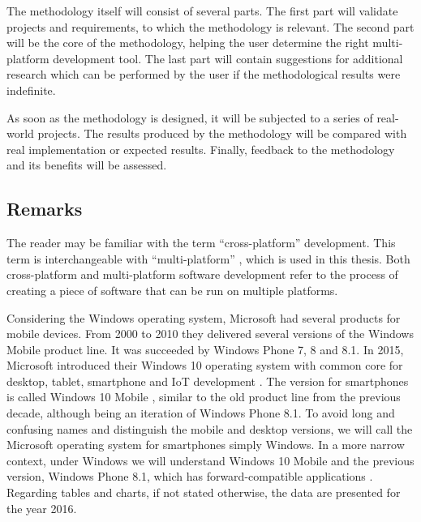 \documentclass[english,master,public,dept460,male,cpdeclaration,oneside]{diploma}
\begin{document}
The methodology itself will consist of several parts. The first part will validate projects and requirements, to which the methodology is relevant. The second part will be the core of the methodology, helping the user determine the right multi-platform development tool. The last part will contain suggestions for additional research which can be performed by the user if the methodological results were indefinite.

As soon as the methodology is designed, it will be subjected to a series of real-world projects. The results produced by the methodology will be compared with real implementation or expected results. Finally, feedback to the methodology and its benefits will be assessed. 

\subsection{Remarks}
The reader may be familiar with the term “cross-platform” development. This term is interchangeable with “multi-platform” \cite{wikiCrossPlatform}, which is used in this thesis. Both cross-platform and multi-platform software development refer to the process of creating a piece of software that can be run on multiple platforms.

Considering the Windows operating system, Microsoft had several products for mobile devices. From 2000 to 2010 they delivered several versions of the Windows Mobile product line. It was succeeded by Windows Phone 7, 8 and 8.1. In 2015, Microsoft introduced their Windows 10 operating system with common core for desktop, tablet, smartphone and IoT development \cite{windowsDevCenter}. The version for smartphones is called Windows 10 Mobile \cite{wikiWindowsMobile}, similar to the old product line from the previous decade, although being an iteration of Windows Phone 8.1. To avoid long and confusing names and distinguish the mobile and desktop versions, we will call the Microsoft operating system for smartphones simply Windows. In a more narrow context, under Windows we will understand Windows 10 Mobile and the previous version, Windows Phone 8.1, which has forward-compatible applications \cite{blogsWindows8to10}. 
Regarding tables and charts, if not stated otherwise, the data are presented for the year 2016.
\end{document}
